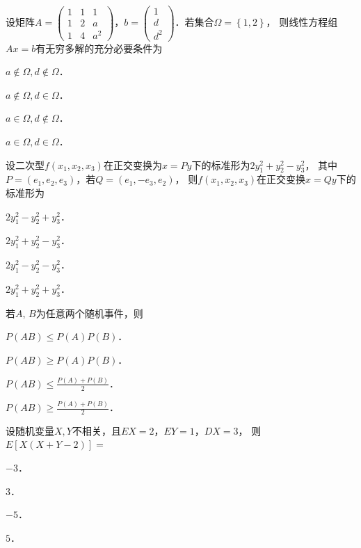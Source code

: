 \documentclass[plain,noanswer,medmath]{../../template/jnuexam}
\begin{document}
\begin{problem}
设矩阵$A = \begin{pmatrix}
  1 & 1 & 1 \\
  1 & 2 & a \\
  1 & 4 & a^2
\end{pmatrix}$，$b = \begin{pmatrix}
  1 \\
  d \\
  d^2
\end{pmatrix}$．若集合$\Omega = \left\{1,\left. 2 \right\} \right.$，
则线性方程组$Ax = b$有无穷多解的充分必要条件为\pickout{}
\begin{abcd}
\item $a \notin \Omega ,d \notin \Omega$．
\item $a \notin \Omega ,d \in \Omega$．
\item $a \in \Omega ,d \notin \Omega$．
\item $a \in \Omega ,d \in \Omega$．
\end{abcd}
\end{problem}


\begin{problem}
设二次型$f\left(x_1,x_2,x_3 \right)$在正交变换为$x = Py$下的标准形为$2y_1^2 + y_2^2 - y_3^2$，
其中$P = \left(e_1,e_2,e_3 \right)$，若$Q = \left(e_1, - e_3,e_2 \right)$，
则$f\left(x_1,x_2,x_3 \right)$在正交变换$x = Qy$下的标准形为\pickout{}
\begin{abcd}
\item $2y_1^2 - y_2^2 + y_3^2$．
\item $2y_1^2 + y_2^2 - y_3^2$．
\item $2y_1^2 - y_2^2 - y_3^2$．
\item $2y_1^2 + y_2^2 + y_3^2$．
\end{abcd}
\end{problem}


\begin{problem}
若$A$, $B$为任意两个随机事件，则\pickout{}
\begin{abcd}
\item $P(AB) \le P(A)P(B)$．
\item $P(AB) \ge P(A)P(B)$．
\item $P(AB) \le \frac{P(A) + P(B)}{2}$．
\item $P(AB) \ge \frac{P(A) + P(B)}{2}$．
\end{abcd}
\end{problem}


\begin{problem}
设随机变量$X,Y$不相关，且$EX = 2$，$EY = 1$，$DX = 3$，
则$E\left[X\left(X + Y - 2 \right) \right] =$\pickout{}
\begin{abcd}
\item $- 3$．
\item $3$．
\item $- 5$．
\item $5$．
\end{abcd}
\end{problem}
\end{document}
